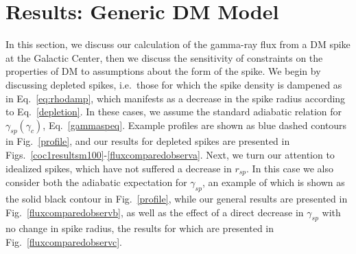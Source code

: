 \documentclass[11pt]{article}
\newcommand{\be}{\begin{equation}}
\newcommand{\ee}{\end{equation}}
\begin{document}
\section{Results: Generic DM Model} \label{results}

In this section, we discuss our calculation of the gamma-ray flux from a DM spike at the Galactic Center, then we discuss the sensitivity of constraints on the properties of DM to assumptions about the form of the spike.  We begin by discussing depleted spikes, i.e.~those for which the spike density is dampened as in Eq.~\ref{eq:rhodamp}, which manifests as a decrease in the spike radius according to Eq.~\ref{depletion}.  In these cases, we assume the standard adiabatic relation for $\gamma_{sp}(\gamma_c)$, Eq.~\ref{gammaspeq}. 
Example profiles are shown as blue dashed contours in Fig.~\ref{profile}, and our results for depleted spikes are presented in Figs.~\ref{coc1resultsm100}-\ref{fluxcomparedobserva}. Next, we turn our attention to idealized spikes, which have not suffered a decrease in $r_{sp}$.  In this case we also consider both the adiabatic expectation for $\gamma_{sp}$, an example of which is shown as the solid black contour in Fig.~\ref{profile}, while our general results are presented in Fig.~\ref{fluxcomparedobservb}, as well as the effect of a direct decrease in $\gamma_{sp}$ with no change in spike radius, the results for which are presented in Fig.~\ref{fluxcomparedobservc}.



%
%

%
%



\end{document}
